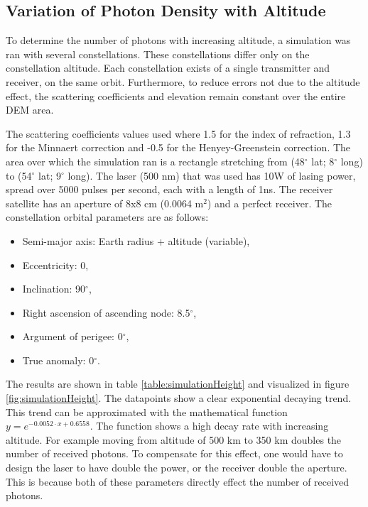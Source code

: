 \subsection{Variation of Photon Density with Altitude}
\label{sec:VariationOfPhotonDensity}

To determine the number of photons with increasing altitude, a simulation was ran with several constellations. These constellations differ only on the constellation altitude. Each constellation exists of a single transmitter and receiver, on the same orbit. Furthermore, to reduce errors not due to the altitude effect, the scattering coefficients and elevation remain constant over the entire \ac{DEM} area.

The scattering coefficients values used where 1.5 for the index of refraction, 1.3 for the Minnaert correction and -0.5 for the Henyey-Greenstein correction. The area over which the simulation ran is a rectangle stretching from (48$^\circ$ lat; 8$^\circ$ long) to (54$^\circ$ lat; 9$^\circ$ long). The \ac{laser} (500 nm) that was used has 10W of lasing power, spread over 5000 pulses per second, each with a length of 1ns. The receiver satellite has an aperture of 8x8 cm (0.0064 m$^2$) and a perfect receiver. The constellation orbital parameters are as follows:

\begin{itemize}
	\item Semi-major axis:	Earth radius + altitude (variable),
	\item Eccentricity: 0,
	\item Inclination: 90$^\circ$,
	\item Right ascension of ascending node: 8.5$^\circ$,
	\item Argument of perigee: 0$^\circ$,
	\item True anomaly: 0$^\circ$.
\end{itemize}

The results are shown in table \ref{table:simulationHeight} and visualized in figure \ref{fig:simulationHeight}. The datapoints show a clear exponential decaying trend. This trend can be approximated with the mathematical function $y=e^{-0.0052 \cdot x + 0.6558}$. The function shows a high decay rate with increasing altitude. For example moving from altitude of 500 km to 350 km doubles the number of received photons. To compensate for this effect, one would have to design the \ac{laser} to have double the power, or the receiver double the aperture. This is because both of these parameters directly effect the number of received photons. 

